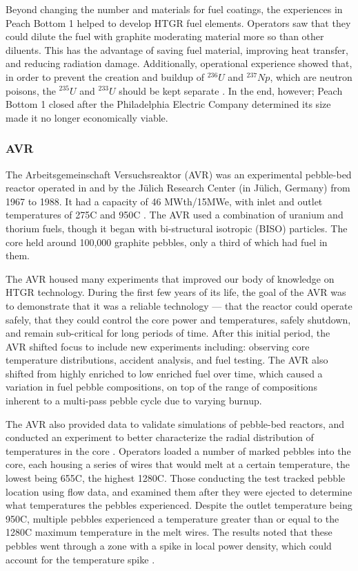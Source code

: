 Beyond changing the number and materials for fuel coatings, the experiences in Peach Bottom 1 helped to develop HTGR fuel elements.  Operators saw that they could dilute the fuel with graphite moderating material more so than other diluents.  This has the advantage of saving fuel material, improving heat transfer, and reducing radiation damage.  Additionally, operational experience showed that, in order to prevent the creation and buildup of $^{236}U$ and $^{237}Np$, which are neutron poisons, the $^{235}U$ and $^{233}U$ should be kept separate \cite{simnad_early_1991}.  In the end, however; Peach Bottom 1 closed after the Philadelphia Electric Company determined its size made it no longer economically viable.

\subsubsection{AVR}
\label{avr}

The Arbeitsgemeinschaft Versuchsreaktor (AVR) was an experimental pebble-bed reactor operated in and by the Jülich Research Center (in Jülich, Germany) from 1967 to 1988.  It had a capacity of 46 MWth/15MWe, with inlet and outlet temperatures of 275\textdegree  C and 950\textdegree  C \cite{beck_high_2011}.  The AVR used a combination of uranium and thorium fuels, though it began with bi-structural isotropic (BISO) particles.  The core held around 100,000 graphite pebbles, only a third of which had fuel in them.

The AVR housed many experiments that improved our body of knowledge on HTGR technology.  During the first few years of its life, the goal of the AVR was to demonstrate that it was a reliable technology --- that the reactor could operate safely, that they could control the core power and temperatures, safely shutdown, and remain sub-critical for long periods of time.  After this initial period, the AVR shifted focus to include new experiments including: observing core temperature distributions, accident analysis, and fuel testing.  The AVR also shifted from highly enriched to low enriched fuel over time, which caused a variation in fuel pebble compositions, on top of the range of compositions inherent to a multi-pass pebble cycle due to varying burnup.

The AVR also provided data to validate simulations of pebble-bed reactors, and conducted an experiment to better characterize the radial distribution of temperatures in the core \cite{gottaut_results_1990}.  Operators loaded a number of marked pebbles into the core, each housing a series of wires that would melt at a certain temperature, the lowest being 655\textdegree  C, the highest 1280\textdegree  C.  Those conducting the test tracked pebble location using flow data, and examined them after they were ejected to determine what temperatures the pebbles experienced.  Despite the outlet temperature being 950\textdegree  C, multiple pebbles experienced a temperature greater than or equal to the 1280\textdegree C maximum temperature in the melt wires.  The results noted that these pebbles went through a zone with a spike in local power density, which could account for the temperature spike \cite{gottaut_results_1990}.

